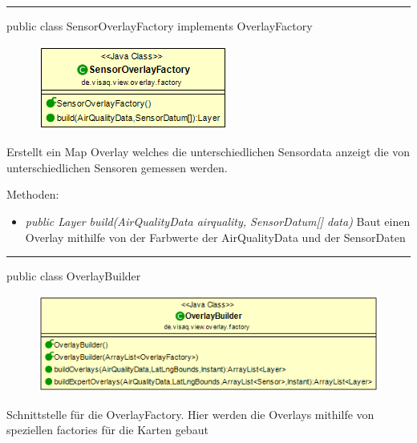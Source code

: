 \rule{\textwidth}{0.4pt}
public class SensorOverlayFactory implements OverlayFactory

\begin{minipage}{0.3\textwidth}
    \begin{figure}[H]
        \includegraphics[scale = 0.5]{media/frontend/view/de.view.overlay.factory/SensorOverlayFactory_Class.png}
    \end{figure}
    \end{minipage} \hfill
    \begin{minipage}{0.6\textwidth}
        Erstellt ein Map Overlay welches die unterschiedlichen Sensordata anzeigt die von unterschiedlichen Sensoren gemessen werden.
\end{minipage}

Methoden:
\begin{itemize}
    \item \emph{public Layer build(AirQualityData airquality, SensorDatum[] data)}  Baut einen Overlay mithilfe von der Farbwerte der AirQualityData und der SensorDaten
\end{itemize}

\rule{\textwidth}{0.4pt}
public class OverlayBuilder

\begin{minipage}{0.6\textwidth}
    \begin{figure}[H]
        \includegraphics[scale = 0.5]{media/frontend/view/de.view.overlay.factory/OverlayBuilder_Class.png}
    \end{figure}
    \end{minipage} \hfill
    \begin{minipage}{0.4\textwidth}
Schnittstelle für die OverlayFactory. Hier werden die Overlays mithilfe von speziellen factories für die Karten gebaut
\end{minipage}

